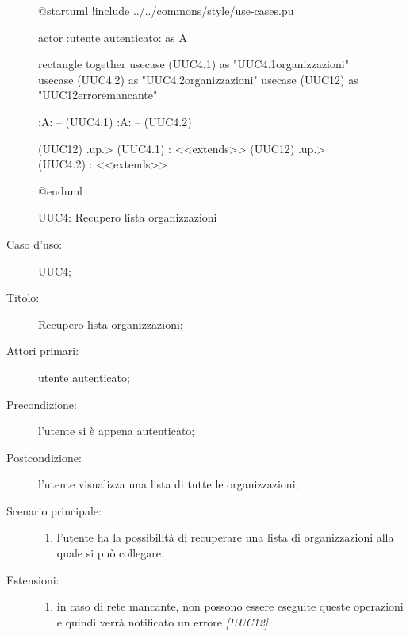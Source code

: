 \documentclass[../../../analisi-dei-requisiti.tex]{subfiles}
\begin{document}
\begin{figure}[H]
  \centering
  \begin{plantuml}
  @startuml
  !include ../../commons/style/use-cases.pu

  actor :utente autenticato: as A

  rectangle {
    together {
      usecase (UUC4.1) as "UUC4.1\nAggiornamento\nlista organizzazioni"
      usecase (UUC4.2) as "UUC4.2\nSeleziona organizzazioni"
      usecase (UUC12) as "UUC12\nVisualizzazione errore\nrete mancante"
    }
  }

  :A: -- (UUC4.1)
  :A: -- (UUC4.2)

  (UUC12) .up.> (UUC4.1) : <<extends>>
  (UUC12) .up.> (UUC4.2) : <<extends>>

  @enduml
  \end{plantuml}
  \caption{UUC4: Recupero lista organizzazioni}%
  \label{fig:uuc4}
\end{figure}

\begin{description}
  \item[Caso d’uso:] UUC4;
  \item[Titolo:] Recupero lista organizzazioni;
  \item[Attori primari:] utente autenticato;
  \item[Precondizione:] l'utente si è appena autenticato;
  \item[Postcondizione:] l'utente visualizza una lista di tutte le organizzazioni;
  \item[Scenario principale:]
        \begin{enumerate}
          \item l'utente ha la possibilità di recuperare una lista di organizzazioni alla quale si può collegare.
        \end{enumerate}
  \item[Estensioni:]
        \begin{enumerate}
          \item in caso di rete mancante, non possono essere eseguite queste operazioni e quindi verrà notificato un errore \emph{[UUC12]}.
        \end{enumerate}
\end{description}
\end{document}
